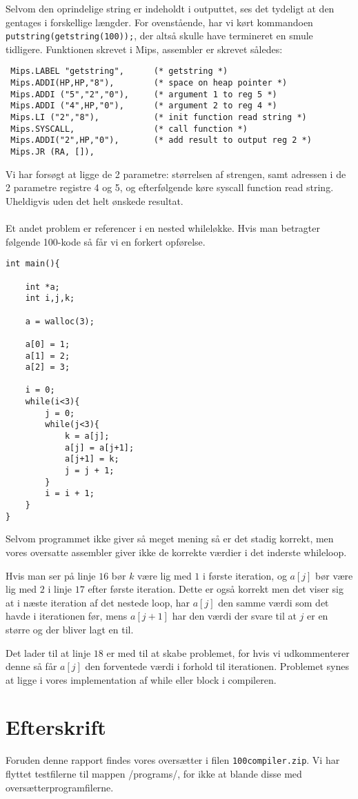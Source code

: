 \documentclass[12pt]{article}
\begin{document}
Selvom den oprindelige string er indeholdt i outputtet, ses det tydeligt at den
gentages i forskellige længder. For ovenstående, har vi kørt kommandoen
\texttt{putstring(getstring(100));}, der altså skulle have termineret en smule
tidligere. Funktionen skrevet i Mips, assembler er skrevet således:

\begin{verbatim}
 Mips.LABEL "getstring",      (* getstring *)
 Mips.ADDI(HP,HP,"8"),        (* space on heap pointer *)
 Mips.ADDI ("5","2","0"),     (* argument 1 to reg 5 *)  
 Mips.ADDI ("4",HP,"0"),      (* argument 2 to reg 4 *)    
 Mips.LI ("2","8"),           (* init function read string *)
 Mips.SYSCALL,                (* call function *)
 Mips.ADDI("2",HP,"0"),       (* add result to output reg 2 *)    
 Mips.JR (RA, []),
\end{verbatim}

Vi har forsøgt at ligge de 2 parametre: størrelsen af strengen, samt adressen i
de 2 parametre registre 4 og 5, og efterfølgende køre syscall function
read string. Uheldigvis uden det helt ønskede resultat.
\\
\\
Et andet problem er referencer i en nested whileløkke. Hvis man betragter
følgende 100-kode så får vi en forkert opførelse.

\begin{verbatim}
int main(){

    int *a;
    int i,j,k;

    a = walloc(3);

    a[0] = 1;
    a[1] = 2;
    a[2] = 3;

    i = 0;
    while(i<3){
        j = 0;
        while(j<3){
            k = a[j];
            a[j] = a[j+1];
            a[j+1] = k;
            j = j + 1;
        }
        i = i + 1;
    }
}
\end{verbatim}

Selvom programmet ikke giver så meget mening så er det stadig korrekt, men vores
oversatte assembler giver ikke de korrekte værdier i det inderste whileloop.

Hvis man ser på linje $16$ bør $k$ være lig med $1$ i første iteration, og
$a[j]$ bør være lig med $2$ i linje $17$ efter første iteration. Dette er også
korrekt men det viser sig at i næste iteration af det nestede loop, har $a[j]$
den samme værdi som det havde i iterationen før, mens $a[j+1]$ har den værdi der
svare til at $j$ er en større og der bliver lagt en til.

Det lader til at linje $18$ er med til at skabe problemet, for hvis vi
udkommenterer denne så får $a[j]$ den forventede værdi i forhold til
iterationen. Problemet synes at ligge i vores implementation af while eller
block i compileren.

\section{Efterskrift}
Foruden denne rapport findes vores oversætter i filen \texttt{100compiler.zip}. Vi har flyttet testfilerne til mappen /programs/, for ikke at blande disse med oversætterprogramfilerne.


{}

\end{document}
